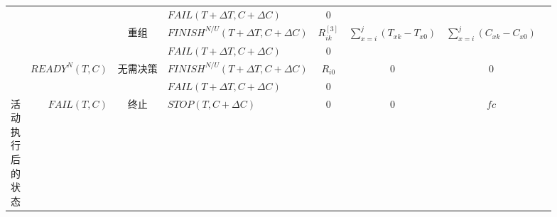 \begin{table}[htbp]
\begin{tabular}{rrrrrrrr}
        \multicolumn{1}{c|}{} 
        &       
        & \multicolumn{1}{|c}{} 
        & \multicolumn{1}{|l}{$FAIL(T+\Delta T,C+\Delta C)$} 
        & \multicolumn{1}{|c}{0} 
        & \multicolumn{1}{|c}{} 
        & \multicolumn{1}{|c}{} \\
        \cline{3-7}

        \multicolumn{1}{c|}{} 
        &       
        & \multicolumn{1}{|c}{\multirow{2}{*}{重组}} 
        & \multicolumn{1}{|l}{$FINISH^{N/U}(T+\Delta T,C+\Delta C)$} 
        & \multicolumn{1}{|c}{$R_{ik}^{[3]}$} 
        & \multicolumn{1}{|c}{\multirow{2}{*}{$\sum\limits_{x = i}^j {({T_{xk}} - {T_{x0}})} $}}
        & \multicolumn{1}{|c}{\multirow{2}{*}{$\sum\limits_{x = i}^j {({C_{xk}} - {C_{x0}})} $}} \\

        \multicolumn{1}{c|}{} 
        &       
        & \multicolumn{1}{|c}{} 
        & \multicolumn{1}{|l}{$FAIL(T+\Delta T,C+\Delta C)$} 
        & \multicolumn{1}{|c}{0} 
        & \multicolumn{1}{|c}{}
        & \multicolumn{1}{|c}{} \\
        \cline{2-7}

        \multicolumn{1}{c|}{} 
        & \multirow{2}{*}{$READY^N(T,C)$} 
        & \multicolumn{1}{|c}{\multirow{2}{*}{无需决策}} 
        & \multicolumn{1}{|l}{$FINISH^{N/U}(T+\Delta T,C+\Delta C)$} 
        & \multicolumn{1}{|c}{$R_{i0}$} 
        & \multicolumn{1}{|c}{\multirow{2}{*}{0}} 
        & \multicolumn{1}{|c}{\multirow{2}{*}{0}} \\

        \multicolumn{1}{c|}{} 
        &       
        & \multicolumn{1}{|c}{} 
        & \multicolumn{1}{|l}{$FAIL(T+\Delta T,C+\Delta C)$} 
        & \multicolumn{1}{|c}{0} 
        & \multicolumn{1}{|c}{} 
        & \multicolumn{1}{|c}{} \\
        \cline{1-7}

        \multicolumn{1}{c|}{\multirow{11}{*}{\parbox{1em}{活\\动\\执\\行\\后\\的\\状\\态}}} 
        & \multirow{7}{*}{$FAIL(T,C)$} 
        & \multicolumn{1}{|c}{终止} 
        & \multicolumn{1}{|l}{$STOP(T,C+\Delta C)$} 
        & \multicolumn{1}{|c}{0} 
        & \multicolumn{1}{|c}{0} 
        & \multicolumn{1}{|c}{$fc$} \\
        \cline{3-7}


\end{tabular}
\end{table}
